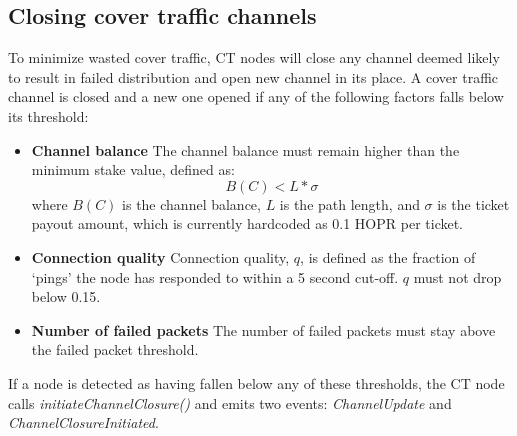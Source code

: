\subsection{Closing cover traffic channels}
To minimize wasted cover traffic, CT nodes will close any channel deemed likely to result in failed distribution and open new channel in its place. A cover traffic channel is closed and a new one opened if any of the following factors falls below its threshold:
  \begin{itemize}
      \item \textbf{Channel balance} The channel balance must remain higher than the minimum stake value, defined as:
      $$B(C) < L * \sigma$$
      where $B(C)$ is the channel balance, $L$ is the path length, and $\sigma$ is the ticket payout amount, which is currently hardcoded as 0.1 HOPR per ticket.
      \item \textbf{Connection quality} Connection quality, $q$, is defined as the fraction of `pings' the node has responded to within a 5 second cut-off. $q$ must not drop below 0.15. 
      \item \textbf{Number of failed packets} The number of failed packets must stay above the failed packet threshold.
      $$ $$
  \end{itemize}
If a node is detected as having fallen below any of these thresholds, the CT node calls \textit{initiateChannelClosure()} and emits two events: \textit{ChannelUpdate} and \textit{ChannelClosureInitiated}.
